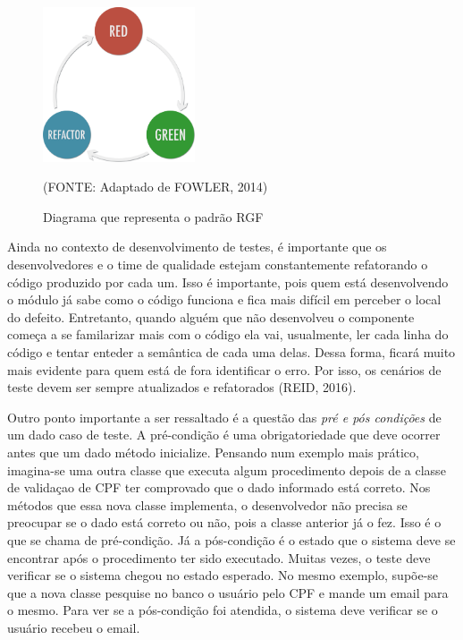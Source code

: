 \documentclass[
    12pt,       %
    openright,      %
    twoside,      %
    a4paper,      %
    english,      %
    french,       %
    spanish,      %
    brazil,       %
    ]{abntex2}
\begin{document}
      \begin{figure}[htbp]
          \begin{center}
              \includegraphics[width=0.4\textwidth]{img/rgf.png}
          \end{center}
          \caption{\label{fig:passaro}Diagrama que representa o padrão RGF}
          \begin{center}(FONTE: Adaptado de FOWLER, 2014)\end{center}
      \end{figure}

      Ainda no contexto de desenvolvimento de testes, é importante que os desenvolvedores
      e o time de qualidade estejam constantemente refatorando o código produzido por
      cada um. Isso é importante, pois quem está desenvolvendo o módulo já sabe como
      o código funciona e fica mais difícil em perceber o local do defeito. Entretanto,
      quando alguém que não desenvolveu o componente começa a se familarizar mais com o código
      ela vai, usualmente, ler cada linha do código e tentar enteder a semântica de cada
      uma delas. Dessa forma, ficará muito mais evidente para quem está de fora identificar
      o erro. Por isso, os cenários de teste devem ser sempre atualizados e refatorados
      (REID, 2016).

      Outro ponto importante a ser ressaltado é a questão das \textit{pré e pós condições} de
      um dado caso de teste. A pré-condição é uma obrigatoriedade que deve ocorrer
      antes que um dado método inicialize. Pensando num exemplo mais prático,
      imagina-se uma outra classe que executa algum procedimento depois de a classe
      de validaçao de CPF ter comprovado que o dado informado está correto. Nos métodos
      que essa nova classe implementa, o desenvolvedor não precisa se preocupar se o
      dado está correto ou não, pois a classe anterior já o fez. Isso é o que se chama
      de pré-condição. Já a pós-condição é o estado que o sistema deve se encontrar
      após o procedimento ter sido executado. Muitas vezes, o teste deve verificar
      se o sistema chegou no estado esperado. No mesmo exemplo, supõe-se que a nova
      classe pesquise no banco o usuário pelo CPF e mande um email para o mesmo. Para
      ver se a pós-condição foi atendida, o sistema deve verificar se o usuário recebeu
      o email.
\end{document}
